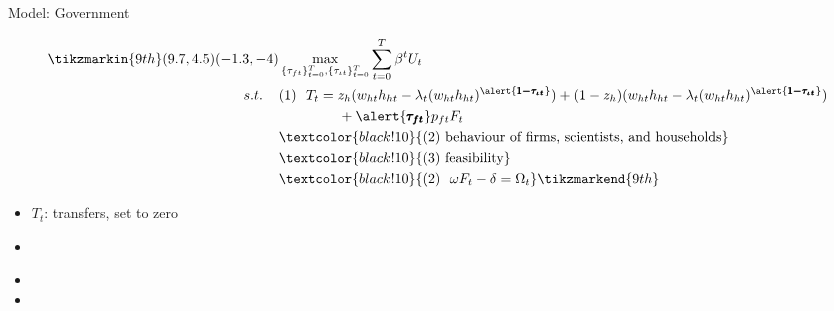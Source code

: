 \documentclass[11pt,aspectratio=169]{beamer}
\begin{document}
\addtocounter{framenumber}{-1}
\begin{frame}{Model: Government}
	\begin{minipage}[t!]{1\textwidth}
		\begin{align*}
		\tikzmarkin{9th}(9.7,4.5)(-1.3,-4)
		&\max_{\{\tau_{ft}\}_{t=0}^{T}, \{\tau_{\iota t}\}_{t=0}^{T}} \sum_{t=0}^{T}\beta^t U_{t}\\
		s.t. \hspace{4mm}
		&(1)\ \ T_t= z_h(w_{ht}h_{ht}-\lambda_t(w_{ht}h_{ht})^{\alert{\pmb{1-\tau_{\iota t}}}})+(1-z_h)(w_{ht}h_{ht}-\lambda_t(w_{ht}h_{ht})^{\alert{\pmb{1-\tau_{\iota t}}}})\\ & \hspace{15mm }+\alert{\pmb{\tau_{ft}}}p_{ft}F_{t}\\
		& \textcolor{black!10}{(2)\ \text{behaviour of firms, scientists, and households}}\\
		& \textcolor{black!10}{(3)\ \text{feasibility} }\\
		&\textcolor{black!10}{
			(2)\ \  \omega F_t-\delta =\Omega_t }
		\tikzmarkend{9th}
		\end{align*}
	\end{minipage}
	
	\small
	\vspace{0mm}
	\begin{minipage}[t!]{0.35\textwidth}
		\vspace{7mm}
		\begin{itemize}
			\item[] $T_t$: transfers, set to zero  \vspace{0mm}
			\item[] 
		\end{itemize}
	\end{minipage}
	\begin{minipage}[t!]{0.6\textwidth}
		\vspace{8mm}
		\begin{itemize}
			\item[]%
			\vspace{0mm}	
			\item[] %
		\end{itemize}
	\end{minipage}
\end{frame}
\end{document}
